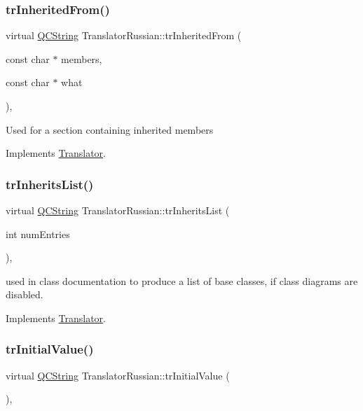 \subsubsection{\texorpdfstring{trInheritedFrom()}{trInheritedFrom()}}
{\footnotesize\ttfamily virtual \mbox{\hyperlink{class_q_c_string}{Q\+C\+String}} Translator\+Russian\+::tr\+Inherited\+From (\begin{DoxyParamCaption}\item[{const char $\ast$}]{members,  }\item[{const char $\ast$}]{what }\end{DoxyParamCaption})\hspace{0.3cm}{\ttfamily [inline]}, {\ttfamily [virtual]}}

Used for a section containing inherited members 

Implements \mbox{\hyperlink{class_translator}{Translator}}.

\mbox{\label{class_translator_russian_afd1deb7c37355f44a4230eca97e265dc}} 
\subsubsection{\texorpdfstring{trInheritsList()}{trInheritsList()}}
{\footnotesize\ttfamily virtual \mbox{\hyperlink{class_q_c_string}{Q\+C\+String}} Translator\+Russian\+::tr\+Inherits\+List (\begin{DoxyParamCaption}\item[{int}]{num\+Entries }\end{DoxyParamCaption})\hspace{0.3cm}{\ttfamily [inline]}, {\ttfamily [virtual]}}

used in class documentation to produce a list of base classes, if class diagrams are disabled. 

Implements \mbox{\hyperlink{class_translator}{Translator}}.

\mbox{\label{class_translator_russian_aede3bc0d9a6bf5d201a6431b469517ae}} 
\subsubsection{\texorpdfstring{trInitialValue()}{trInitialValue()}}
{\footnotesize\ttfamily virtual \mbox{\hyperlink{class_q_c_string}{Q\+C\+String}} Translator\+Russian\+::tr\+Initial\+Value (\begin{DoxyParamCaption}{ }\end{DoxyParamCaption})\hspace{0.3cm}{\ttfamily [inline]}, {\ttfamily [virtual]}}

